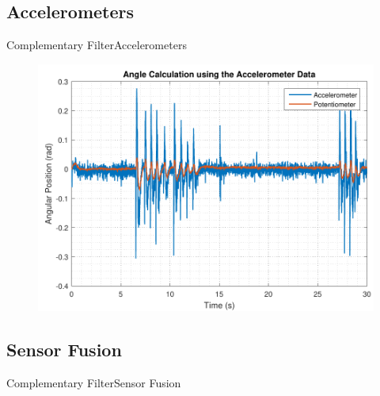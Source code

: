 \subsection{Accelerometers}
\begin{frame}{Complementary Filter}{Accelerometers}
\begin{figure}
	\centering
	\includegraphics[scale=0.6]{Pictures/angleAcc.pdf}
\end{figure}
%
\end{frame}
\subsection{Sensor Fusion}
\begin{frame}{Complementary Filter}{Sensor Fusion}
%
\begin{figure}
	\centering
	
\end{figure}
\end{frame}

